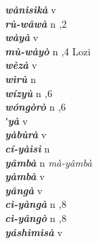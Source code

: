 \begin{multicols}{2}
{{\bfseries\itshape wànìsìkà}} \relax  v  \relax   \relax  {} \relax   \relax  \\
{{\bfseries\itshape rù-wâwà}} \relax  n  ,2  \relax   \relax  \\
{{\bfseries\itshape wàyà}} \relax  v  \relax   \relax  {} \relax   \relax  \\
{{\bfseries\itshape mù-wàyò}} \relax  n  ,4  \relax  Lozi \relax  \\
{{\bfseries\itshape wèzà}} \relax  v  \relax   \relax  {} \relax   \relax  \\
{{\bfseries\itshape wìrù}} \relax  n   \relax  {} \relax   \relax  \\
{{\bfseries\itshape wízyù}} \relax  n  ,6  \relax   \relax  \\
{{\bfseries\itshape wóngòrò}} \relax  n  ,6  \relax   \relax  \\
{{\bfseries\itshape ʹyà}} \relax  v  \relax   \relax  {} \relax   \relax  \\
{{\bfseries\itshape yàbùrà}} \relax  v  \relax   \relax  {} \relax   \relax  \\
{{\bfseries\itshape cí-yàìsì}} \relax  n   \relax  {} \relax   \relax  \\
{{\bfseries\itshape yâmbà}} \relax  n   \relax  \textit{mà-yâmbà} \relax  \\
{{\bfseries\itshape yàmbà}} \relax  v  \relax   \relax  {} \relax   \relax  \\
{{\bfseries\itshape yângà}} \relax  v  \relax   \relax  {} \relax   \relax  \\
{{\bfseries\itshape cì-yàngà}} \relax  n  ,8  \relax   \relax  \\
{{\bfseries\itshape cì-yângò}} \relax  n  ,8  \relax   \relax  \\
{{\bfseries\itshape yáshìmìsà}} \relax  v  \relax   \relax  {} \relax   \relax  \\

\end{multicols}
